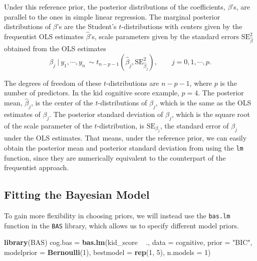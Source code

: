 \documentclass[]{book}
\newenvironment{Shaded}{\begin{snugshade}}{\end{snugshade}}
\newcommand{\KeywordTok}[1]{\textcolor[rgb]{0.13,0.29,0.53}{\textbf{{#1}}}}
\newcommand{\DataTypeTok}[1]{\textcolor[rgb]{0.13,0.29,0.53}{{#1}}}
\newcommand{\DecValTok}[1]{\textcolor[rgb]{0.00,0.00,0.81}{{#1}}}
\newcommand{\StringTok}[1]{\textcolor[rgb]{0.31,0.60,0.02}{{#1}}}
\newcommand{\NormalTok}[1]{{#1}}
\theoremstyle{definition}
\theoremstyle{definition}
\theoremstyle{definition}
\theoremstyle{remark}
\begin{document}
Under this reference prior, the posterior distributions of the
coefficients, \(\beta\)'s, are parallel to the ones in simple linear
regression. The marginal posterior distributions of \(\beta\)'s are the
Student's \(t\)-distributions with centers given by the frequentist OLS
estimates \(\hat{\beta}\)'s, scale parameters given by the standard
errors \(\text{SE}_{\hat{\beta}}^2\) obtained from the OLS estimates \[
\beta_j~|~y_1,\cdots,y_n\ \sim t_{n-p-1}(\hat{\beta}_j, \text{SE}_{\hat{\beta}_j}^2),\qquad j = 0, 1, \cdots, p.
\]

The degrees of freedom of these \(t\)-distributions are \(n-p-1\), where
\(p\) is the number of predictors. In the kid cognitive score example,
\(p=4\). The posterior mean, \(\hat{\beta}_j\), is the center of the
\(t\)-distributions of \(\beta_j\), which is the same as the OLS
estimates of \(\beta_j\). The posterior standard deviation of
\(\beta_j\), which is the square root of the scale parameter of the
\(t\)-distribution, is \(\text{SE}_{\beta_j}\), the standard error of
\(\beta_j\) under the OLS estimates. That means, under the reference
prior, we can easily obtain the posterior mean and posterior standard
deviation from using the \texttt{lm} function, since they are
numerically equivalent to the counterpart of the frequentist approach.

\subsection{Fitting the Bayesian
Model}\label{fitting-the-bayesian-model}

To gain more flexibility in choosing priors, we will instead use the
\texttt{bas.lm} function in the \texttt{BAS} library, which allows us to
specify different model priors.

\begin{Shaded}
\begin{Highlighting}[]
\KeywordTok{library}\NormalTok{(BAS)}
\NormalTok{cog.bas =}\StringTok{ }\KeywordTok{bas.lm}\NormalTok{(kid_score ~}\StringTok{ }\NormalTok{., }\DataTypeTok{data =} \NormalTok{cognitive, }\DataTypeTok{prior =} \StringTok{"BIC"}\NormalTok{, }
                 \DataTypeTok{modelprior =} \KeywordTok{Bernoulli}\NormalTok{(}\DecValTok{1}\NormalTok{), }\DataTypeTok{bestmodel =} \KeywordTok{rep}\NormalTok{(}\DecValTok{1}\NormalTok{, }\DecValTok{5}\NormalTok{), }\DataTypeTok{n.models =} \DecValTok{1}\NormalTok{)}
\end{Highlighting}
\end{Shaded}
\end{document}
